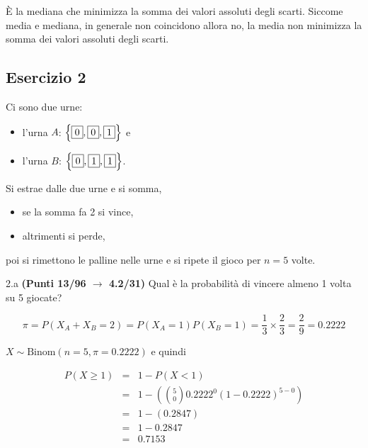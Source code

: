 \documentclass[
  11pt,
]{book}
\providecommand{\tightlist}{%
  \setlength{\itemsep}{0pt}\setlength{\parskip}{0pt}}
\theoremstyle{mytheoremstyle}
\theoremstyle{mydefstyle}
\newenvironment{sol}
  {
  \begin{tcolorbox}[enhanced,breakable,arc=0.1mm,boxrule=1pt,colback=white,colframe=iblue,
  title=\bf \fontfamily{lmss}\selectfont \hspace{.5 cm} Soluzione,drop fuzzy shadow]

}{
\end{tcolorbox}
  }
\begin{document}
\begin{sol}
È la mediana che minimizza la somma dei valori assoluti degli scarti. Siccome media e mediana, in generale non coincidono allora no, la media non minimizza la somma dei valori assoluti degli scarti.

\end{sol}

\subsection{Esercizio 2}\label{esercizio-2-8}

Ci sono due urne:

\begin{itemize}
\tightlist
\item
  l'urna \(A\): \(\left\{\fbox{0},\fbox{0},\fbox{1}\right\}\) e
\item
  l'urna \(B\): \(\left\{\fbox{0},\fbox{1},\fbox{1}\right\}\).
\end{itemize}

Si estrae dalle due urne e si somma,

\begin{itemize}
\tightlist
\item
  se la somma fa 2 si vince,
\item
  altrimenti si perde,
\end{itemize}

poi si rimettono le palline nelle urne e si ripete il gioco per \(n=5\) volte.

2.a \textbf{(Punti 13/96 \(\rightarrow\) 4.2/31)} Qual è la probabilità di vincere almeno 1 volta su 5 giocate?

\begin{sol}
\[
\pi=P(X_A+X_B=2)=P(X_A=1)P(X_B=1)=\frac 13\times\frac23=\frac29=0.2222
\]

\(X\sim\text{Binom}(n=5,\pi=0.2222)\) e quindi

\normalsize 
\begin{eqnarray*}
      P( X \geq 1 ) &=& 1-P( X < 1 ) \\                 &=& 1-\left( \binom{ 5 }{ 0 } 0.2222 ^{ 0 }(1- 0.2222 )^{ 5 - 0 } \right)\\                 &=& 1-( 0.2847 )\\                 &=& 1- 0.2847 \\                 &=&   0.7153 
   \end{eqnarray*}
\normalsize 

\end{sol}
\end{document}
